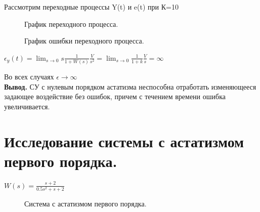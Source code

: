 \documentclass[a4paper, 11pt]{article}
\begin{document}
\normalsize{Рассмотрим переходные процессы Y(t) и e(t) при К=10}

\begin{figure}[h]
    \caption{График переходного процесса.}
    \label{four}
\end{figure}
\begin{figure}[h]
    \caption{График ошибки переходного процесса.}
    \label{tree}
\end{figure}

\normalsize{$\epsilon_y(t)=\lim_{s\to0}s\frac{1}{1+W(s)}\frac{V}{s^2}=\lim_{s\to0}\frac{1}{1+k}\frac{V}{s}=\infty$

Во всех случаях $\epsilon\to\infty$ \\ \textbf{Вывод.} СУ с нулевым порядком астатизма неспособна отработать изменяющееся задающее воздействие без ошибок, причем с течением времени ошибка увеличивается.}
\newpage
\normalsize\section{{Исследование системы с астатизмом первого порядка.}}

\large{$W(s)=\frac{s+2}{0.5s^2+s+2}$}


\begin{figure}[h]
    \caption{Система с астатизмом первого порядка.}
    \label{one}
\end{figure}
\end{document}

